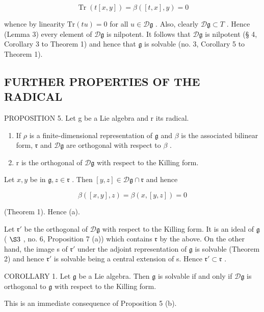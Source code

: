 \[
\operatorname{Tr} (t [ x, y ]) = \beta ([ t, x ], y) = 0
\]

whence by linearity \(\mathrm{Tr}(tu) = 0\) for all \(u\in \mathcal{D}\mathfrak{g}\) . Also, clearly \(\mathcal{D}\mathfrak{g}\subset T\) . Hence (Lemma 3) every element of \(\mathcal{D}\mathfrak{g}\) is nilpotent. It follows that \(\mathcal{D}\mathfrak{g}\) is nilpotent (§ 4, Corollary 3 to Theorem 1) and hence that \(\mathfrak{g}\) is solvable (no. 3, Corollary 5 to Theorem 1).

\subsection{FURTHER PROPERTIES OF THE RADICAL}

PROPOSITION 5. Let g be a Lie algebra and r its radical.

\begin{enumerate}
\def\labelenumi{(\alph{enumi})}
\item
  If \(\rho\) is a finite-dimensional representation of \(\mathfrak{g}\) and \(\beta\) is the associated bilinear form, \(\mathfrak{r}\) and \(\mathcal{D}\mathfrak{g}\) are orthogonal with respect to \(\beta\) .
\item
  r is the orthogonal of \(\mathcal{D}\mathfrak{g}\) with respect to the Killing form.
\end{enumerate}

Let \(x, y\) be in \(\mathfrak{g}, z \in \mathfrak{r}\) . Then \([y, z] \in \mathcal{D}\mathfrak{g} \cap \mathfrak{r}\) and hence

\[
\beta ([ x, y ], z) = \beta (x, [ y, z ]) = 0
\]

(Theorem 1). Hence (a).

Let \(\mathfrak{r}'\) be the orthogonal of \(\mathcal{D}\mathfrak{g}\) with respect to the Killing form. It is an ideal of \(\mathfrak{g}\) ( \(\S 3\) , no. 6, Proposition 7 (a)) which contains \(\mathfrak{r}\) by the above. On the other hand, the image s of \(\mathfrak{r}'\) under the adjoint representation of \(\mathfrak{g}\) is solvable (Theorem 2) and hence \(\mathfrak{r}'\) is solvable being a central extension of s. Hence \(\mathfrak{r}' \subset \mathfrak{r}\) .

COROLLARY 1. Let \(\mathfrak{g}\) be a Lie algebra. Then \(\mathfrak{g}\) is solvable if and only if \(\mathcal{D}\mathfrak{g}\) is orthogonal to \(\mathfrak{g}\) with respect to the Killing form.

This is an immediate consequence of Proposition 5 (b).

